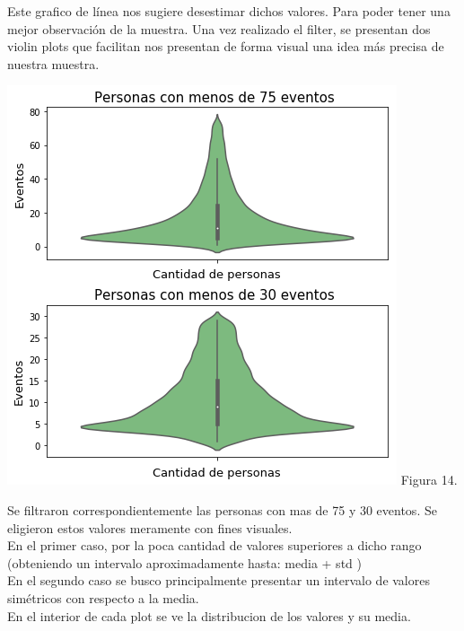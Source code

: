 \documentclass[a4paper ,12pt]{article}
\begin{document}
\newpage

Este grafico de línea nos sugiere desestimar dichos valores. Para poder tener una mejor observación de la muestra. 
Una vez realizado el filter, se presentan dos violin plots que facilitan nos presentan de forma visual una idea más precisa de nuestra muestra. 
\\

\begin{center}
	\includegraphics[width=1.1\linewidth]{output_55_1}
	Figura 14.
	
\end{center}

Se filtraron correspondientemente las personas con mas de 75 y 30 eventos. Se eligieron estos valores meramente con fines visuales.\\


En el primer caso, por la poca cantidad de valores superiores a dicho rango (obteniendo un intervalo aproximadamente hasta: media + std )\\


En el segundo caso se busco principalmente presentar un intervalo de valores simétricos con respecto a la media.\\


En el interior de cada plot se ve la distribucion de los valores y su media.\\
\end{document}
